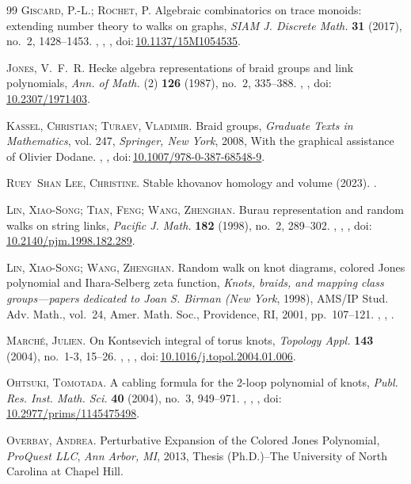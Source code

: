 \documentclass[11pt,hyp,]{nyjm}
\newcommand{\doi}[1]{doi:\,\href{http://dx.doi.org/#1}{#1}}
\numberwithin{thm}{section}
\theoremstyle{definition}
\theoremstyle{remark}
\begin{document}
\begin{thebibliography}{99}
		{\scshape Giscard, P.-L.; Rochet, P.} Algebraic combinatorics on trace monoids:
			extending number theory to walks on graphs, \emph{SIAM J. Discrete Math.}
		\textbf{31} (2017), no.~2, 1428--1453. , , , \doi{10.1137/15M1054535}.
		
		{\scshape Jones, V.~F.~R.} Hecke algebra representations of braid groups and link
			polynomials, \emph{Ann. of Math.} (2) \textbf{126} (1987), no.~2, 335--388.
		, , \doi{10.2307/1971403}.
		
		{\scshape Kassel, Christian; Turaev, Vladimir.} Braid groups, \emph{Graduate Texts in
		Mathematics}, vol. 247, \emph{Springer, New York}, 2008, With the graphical
		assistance of Olivier Dodane. , , \doi{10.1007/978-0-387-68548-9}.
		
		{\scshape Ruey~Shan Lee, Christine.} Stable khovanov homology and volume (2023).
		.
		
		{\scshape Lin, Xiao-Song; Tian, Feng; Wang, Zhenghan.} Burau representation and
			random walks on string links, \emph{Pacific J. Math.} \textbf{182} (1998), no.~2,
		289--302. , , , \doi{10.2140/pjm.1998.182.289}.
		
		{\scshape Lin, Xiao-Song; Wang, Zhenghan.} Random walk on knot diagrams, colored
			{J}ones polynomial and {I}hara-{S}elberg zeta function, \emph{Knots, braids, and
		mapping class groups---papers dedicated to {J}oan {S}. {B}irman ({N}ew
		{Y}ork}, 1998), AMS/IP Stud. Adv. Math., vol.~24, Amer. Math. Soc.,
		Providence, RI, 2001, pp.~107--121. , , .
		
		{\scshape March\'e, Julien.} On {K}ontsevich integral of torus knots, \emph{Topology Appl.}
		\textbf{143} (2004), no.~1-3, 15--26. , , , \doi{10.1016/j.topol.2004.01.006}.
		
		{\scshape Ohtsuki, Tomotada.} A cabling formula for the 2-loop polynomial of knots,
		\emph{Publ. Res. Inst. Math. Sci.} \textbf{40} (2004), no.~3, 949--971. , , , \doi{10.2977/prims/1145475498}.
		
		{\scshape Overbay, Andrea.} Perturbative {E}xpansion of the {C}olored {J}ones
			{P}olynomial, \emph{ProQuest LLC}, \emph{Ann Arbor, MI}, 2013, Thesis (Ph.D.)--The
		University of North Carolina at Chapel Hill. 
		

\end{thebibliography}
\end{document}
